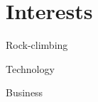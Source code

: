 \documentclass[letterpaper]{deedy-resume} %
\begin{document}
\begin{minipage}[t]{0.66\textwidth}
\section{Interests}
\vspace{\topsep} %
\begin{tightitemize}
  \item Rock-climbing
  \item Technology
  \item Business
\end{tightitemize}

\sectionspace %

\end{minipage} %








\end{document}
